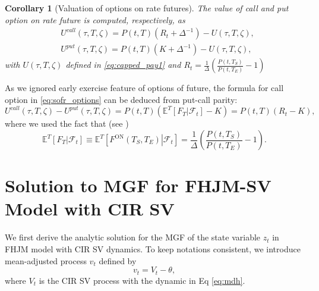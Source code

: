 \documentclass[pdftex,11pt,a4paper] {article}
\newtheorem{corollary}{Corollary}[section]
\begin{document}
\begin{corollary}[Valuation of options on rate futures]\label{cl:sofr}
The value of call and put option on rate future is computed, respectively, as
\begin{equation}\label{eq:sofr_options}
\begin{split}
&U^{call}(\tau, T, \zeta)= P(t,T)(R_t+\Delta^{-1})-U(\tau, T, \zeta),\\
&U^{put}(\tau, T, \zeta)= P(t,T)(K+\Delta^{-1})-U(\tau, T, \zeta),
\end{split}
\end{equation}
with $U(\tau, T, \zeta)$ defined in \eqref{eq:capped_pay1} and $R_t=\frac{1}{\Delta}\left(\frac{P(t,T_S)}{P(t,T_E)}-1\right)$
\end{corollary}

As we ignored early exercise feature of options of future, the formula for call option in \eqref{eq:sofr_options} can be deduced from put-call parity: 
\begin{equation}\label{eq:sofr_options2}
U^{call}(\tau, T, \zeta)-U^{put}(\tau, T, \zeta)=P(t,T)\left(\mathbb{E}^T\left[\left.F_T\right|\mathcal{F}_t\right]-K\right)=P(t,T)\left(R_t-K\right),
\end{equation}
where we used the fact that (see \cite{Lyashenko2019})
\begin{equation*}
\mathbb{E}^{T}\left[\left.F_{T}\right|\mathcal{F}_t\right]\equiv\mathbb{E}^{T}\left[\left.F^{\mathrm{ON}}(T_S,T_E)\right|\mathcal{F}_t\right]=\frac{1}{\Delta}\left(\frac{P(t,T_S)}{P(t,T_E)}-1\right).
\end{equation*}







\section{Solution to MGF for FHJM-SV Model with CIR SV}

We first derive the analytic solution for the MGF of the state variable $z_t$ in FHJM model with CIR SV dynamics. To keep notations consistent, we introduce mean-adjusted process $v_t$ defined by
\begin{equation}
v_t=V_t-\theta,
\end{equation}
where $V_t$ is the CIR SV process with the dynamic in Eq \eqref{eq:mdh}.
\end{document}
